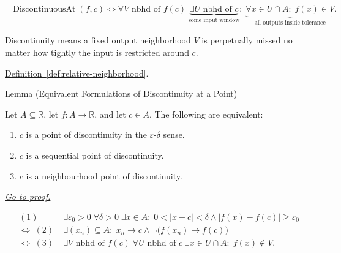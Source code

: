 \begin{remark*}
\[
\neg \operatorname{DiscontinuousAt}(f,c)
\Longleftrightarrow
\forall V \text{ nbhd of } f(c)\;
\underbrace{\exists U \text{ nbhd of } c}_{\text{some input window}}
:\;
\underbrace{\forall x \in U \cap A:\; f(x) \in V}_{\text{all outputs inside tolerance}}.
\]
\end{remark*}

\begin{remark*}[Interpretation]
Discontinuity means a fixed output neighborhood $V$ is perpetually missed no matter how tightly the input is restricted around $c$.
\end{remark*}

\begin{dependencies}
\hyperref[def:relative-neighborhood]{Definition~\ref*{def:relative-neighborhood}}.
\end{dependencies}


\begin{lemmabox}{Lemma (Equivalent Formulations of Discontinuity at a Point)}
\begin{lemma}
\label{lem:equivalent-discontinuity-at-a-point}
Let $A\subseteq \mathbb{R}$, let $f:A\to\mathbb{R}$, and let $c\in A$. The following are equivalent:
\begin{enumerate}
\item $c$ is a point of discontinuity in the $\varepsilon$-$\delta$ sense.
\item $c$ is a sequential point of discontinuity.
\item $c$ is a neighbourhood point of discontinuity.
\end{enumerate}

\smallskip\noindent
\hyperref[prf:equivalent-discontinuity-at-a-point]{\textit{Go to proof.}}
\end{lemma}
\end{lemmabox}

\begin{remark*}
\[
\begin{aligned}
(1)\; &\exists \varepsilon_0>0\;\forall \delta>0\;\exists x\in A:\;0<|x-c|<\delta \land |f(x)-f(c)|\ge \varepsilon_0\\
\Longleftrightarrow\;
(2)\; &\exists (x_n)\subseteq A:\; x_n \to c \land \neg\bigl(f(x_n)\to f(c)\bigr)\\
\Longleftrightarrow\;
(3)\; &\exists V \text{ nbhd of } f(c)\;\forall U \text{ nbhd of } c\;\exists x\in U\cap A:\;f(x)\notin V.
\end{aligned}
\]
\end{remark*}

